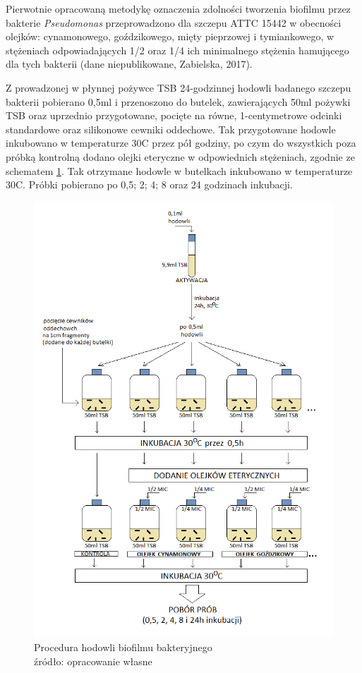 \documentclass[11pt,a4paper]{report}
\begin{document}
Pierwotnie opracowaną metodykę oznaczenia zdolności tworzenia biofilmu przez bakterie \textit{Pseudomonas} przeprowadzono dla szczepu ATTC 15442 w obecności olejków: cynamonowego, goździkowego, mięty pieprzowej i tymiankowego, w stężeniach odpowiadających 1/2 oraz 1/4 ich minimalnego stężenia hamującego dla tych bakterii (dane niepublikowane, Zabielska, 2017).\

Z prowadzonej w płynnej pożywce TSB 24-godzinnej hodowli badanego szczepu bakterii pobierano 0,5ml i przenoszono do butelek, zawierających 50ml pożywki TSB oraz uprzednio przygotowane, pocięte na równe, 1-centymetrowe odcinki standardowe oraz silikonowe cewniki oddechowe. 
Tak przygotowane hodowle inkubowano w temperaturze 30\degree C przez pół godziny, po czym do wszystkich poza próbką kontrolną dodano olejki eteryczne w odpowiednich stężeniach, zgodnie ze schematem \ref{metoda_pierwotna}.
Tak otrzymane hodowle w butelkach inkubowano w temperaturze 30\degree C.
Próbki pobierano po 0,5; 2; 4; 8 oraz 24 godzinach inkubacji.

\clearpage
\begin{figure}[!h]
\begin{center}
\includegraphics[scale=0.72]{img/mgr_metodyka_stara.png}
\caption{Procedura hodowli biofilmu bakteryjnego\\
źródło: opracowanie własne}\label{metoda_pierwotna}
\end{center} 
\end{figure}
\clearpage
\end{document}
